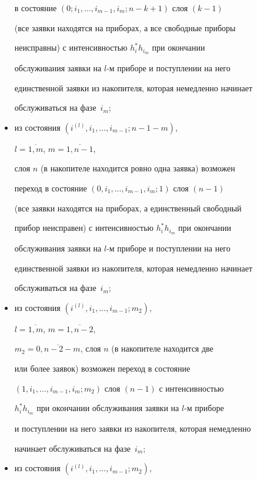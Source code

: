 \begin{multicols}{2}
\begin{itemize}
в состояние $\left(0;i_1,\ldots,i_{m-1},i_m;n-k+1\right)$ слоя $(k-1)$


(все заявки находятся на приборах, а все свободные приборы


неисправны) с интенсивностью $h_i^* h_{i_m}$ при окончании


обслуживания заявки на $l$-м приборе и поступлении на него


единственной заявки из накопителя, которая немедленно начинает


обслуживаться на фазе~$i_m$;


\item


из состояния $\left(i^{(l)},i_1,\ldots,i_{m-1};n-1-m\right)$,\linebreak


$l=\overline{1,m}$, $m=\overline{1,n-1}$,


слоя $n$ (в накопителе находится ровно одна заявка) возможен


переход в состояние $(0,i_1,\ldots,i_{m-1},i_m;1)$ слоя $(n-1)$


(все заявки находятся на приборах, а единственный свободный


прибор неисправен) с ин\-тен\-сив\-ностью $h_i^*h_{i_m}$ при окончании


обслуживания заявки на $l$-м приборе и поступлении на него


единственной заявки из накопителя, которая немедленно начинает


обслуживаться на фазе~$i_m$;


\item


 из состояния $\left(i^{(l)},i_1,\ldots,i_{m-1};m_2\right)$,


$l=\overline{1,m}$, $m=\overline{1,n-2}$,


$m_2=\overline{0,n-2-m}$, слоя $n$ (в накопителе находится две


или более заявок) возможен переход в состояние


$\left(1,i_1,\ldots, i_{m-1},i_m;m_2\right)$ слоя $(n-1)$ с интенсивностью


$h_i^*h_{i_m}$ при окончании обслуживания заявки на $l$-м приборе


и поступлении на него заявки из накопителя, которая немедленно


начинает обслуживаться на фазе~$i_m$;


\item


из состояния $\left(i^{(l)},i_1,\ldots,i_{m-1};m_2\right)$,



\end{itemize}
\end{multicols}
